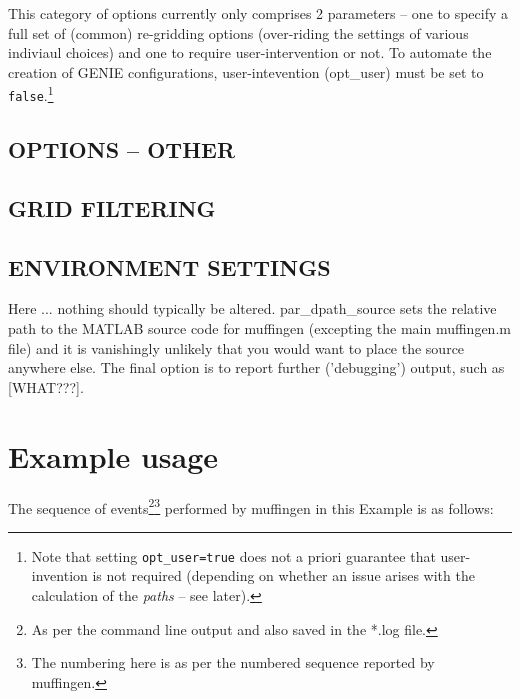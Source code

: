 \documentclass[11pt,fleqn]{book} %
\begin{document}
This category of options currently only comprises 2 parameters -- one to specify a full set of (common) re-gridding options (over-riding the settings of various indiviaul choices) and one to require user-intervention or not. To automate the creation of GENIE configurations, user-intevention (opt\_user) must be set to \texttt{false}.\footnote{Note that setting \texttt{opt\_user=true} does not a priori guarantee that user-invention is not required (depending on whether an issue arises with the calculation of the \textit{paths} -- see later).}


\subsection{OPTIONS -- OTHER}

%

\subsection{GRID FILTERING}


\subsection{ENVIRONMENT SETTINGS}

Here ... nothing should typically be altered. par\_dpath\_source sets the relative path to the MATLAB source code for muffingen (excepting the main muffingen.m file) and it is vanishingly unlikely that you would want to place the source anywhere else. The final option is to report further ('debugging') output, such as [WHAT???].


\section{Example usage}

The sequence of events\footnote{As per the command line output and also saved in the *.log file.}\footnote{The numbering here is as per the numbered sequence reported by muffingen.} performed by muffingen in this Example is as follows:
\end{document}

